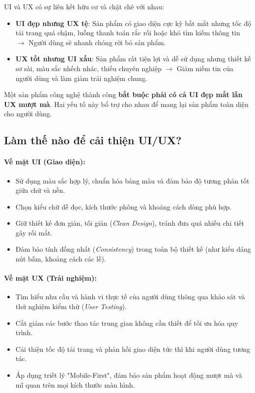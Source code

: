 UI và UX có sự liên kết hữu cơ và chặt chẽ với nhau:
\begin{itemize}[leftmargin=1.8em, itemsep=3pt, parsep=0pt]
    \item \textbf{UI đẹp nhưng UX tệ}: Sản phẩm có giao diện cực kỳ bắt mắt nhưng tốc độ tải trang quá chậm, luồng thanh toán rắc rối hoặc khó tìm kiếm thông tin $\rightarrow$ Người dùng sẽ nhanh chóng rời bỏ sản phẩm.
    \item \textbf{UX tốt nhưng UI xấu}: Sản phẩm rất tiện lợi và dễ sử dụng nhưng thiết kế sơ sài, màu sắc nhếch nhác, thiếu chuyên nghiệp $\rightarrow$ Giảm niềm tin của người dùng và làm giảm trải nghiệm chung.
\end{itemize}

\begin{noteBox}
Một sản phẩm công nghệ thành công \textbf{bắt buộc phải có cả UI đẹp mắt lẫn UX mượt mà}. Hai yếu tố này bổ trợ cho nhau để mang lại sản phẩm toàn diện cho người dùng.
\end{noteBox}

\subsection{Làm thế nào để cải thiện UI/UX?}

\paragraph{Về mặt UI (Giao diện):}
\begin{itemize}[leftmargin=1.8em, itemsep=2pt, parsep=0pt]
    \item Sử dụng màu sắc hợp lý, chuẩn hóa bảng màu và đảm bảo độ tương phản tốt giữa chữ và nền.
    \item Chọn kiểu chữ dễ đọc, kích thước phông và khoảng cách dòng phù hợp.
    \item Giữ thiết kế đơn giản, tối giản (\textit{Clean Design}), tránh đưa quá nhiều chi tiết gây rối mắt.
    \item Đảm bảo tính đồng nhất (\textit{Consistency}) trong toàn bộ thiết kế (như kiểu dáng nút bấm, khoảng cách các lề).
\end{itemize}

\paragraph{Về mặt UX (Trải nghiệm):}
\begin{itemize}[leftmargin=1.8em, itemsep=2pt, parsep=0pt]
    \item Tìm hiểu nhu cầu và hành vi thực tế của người dùng thông qua khảo sát và thử nghiệm kiểm thử (\textit{User Testing}).
    \item Cắt giảm các bước thao tác trung gian không cần thiết để tối ưu hóa quy trình.
    \item Cải thiện tốc độ tải trang và phản hồi giao diện tức thì khi người dùng tương tác.
    \item Áp dụng triết lý "Mobile-First", đảm bảo sản phẩm hoạt động mượt mà và mĩ quan trên mọi kích thước màn hình.
\end{itemize}

